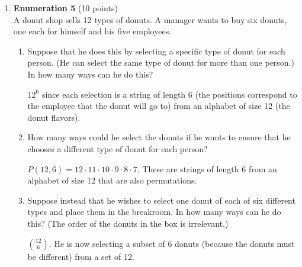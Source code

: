 \begin{enumerate}
  \newpage

  \item \textbf{Enumeration 5} (10 points)\\
  A donut shop sells 12 types of donuts. A manager wants to buy six donuts, one each for himself and his five employees.
  \begin{enumerate}[label=\alph*.]
    \item Suppose that he does this by selecting a specific type of donut for each person. 
    (He can select the same type of donut for more than one person.) In how many ways can he do this?
    \begin{subanswer}
      $12^6$ since each selection is a string of length 6 (the positions correspond to the employee that the donut will go to) 
      from an alphabet of size 12 (the donut flavors).
    \end{subanswer}
    \item How many ways could he select the donuts if he wants to ensure that he chooses a different type of donut for each person?
    \begin{subanswer}
      $P(12,6) = 12 \cdot 11 \cdot 10 \cdot 9 \cdot 8 \cdot 7$. These are strings of length 6 from 
      an alphabet of size 12 that are also permutations.
    \end{subanswer}
    \item Suppose instead that he wishes to select one donut of each of six different types and place them in the breakroom. 
    In how many ways can he do this? (The order of the donuts in the box is irrelevant.)  
    \begin{subanswer}
      $\binom{12}{6}$. He is now selecting a subset of 6 donuts (because the donuts must be different) from a set of 12.
    \end{subanswer}
  \end{enumerate}


\end{enumerate}
